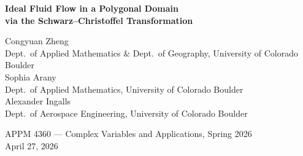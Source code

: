 \documentclass[11pt]{article}
\newcommand{\HH}{\mathbb{H}}          %
\begin{document}
\begin{titlepage}
  \centering
  \vspace*{3.5cm}
  {\LARGE\bfseries Ideal Fluid Flow in a Polygonal Domain\\[0.6em]
   via the Schwarz--Christoffel Transformation\par}
  \vspace{2.5cm}
  {\large
    Congyuan Zheng\\
    \small Dept.\ of Applied Mathematics \& Dept.\ of Geography,
    University of Colorado Boulder\\[1em]
    \large Sophia Arany\\
    \small Dept.\ of Applied Mathematics,
    University of Colorado Boulder\\[1em]
    \large Alexander Ingalls\\
    \small Dept.\ of Aerospace Engineering,
    University of Colorado Boulder\par}
  \vspace{2.5cm}
  {\normalsize APPM 4360 --- Complex Variables and Applications,
   Spring 2026\\[0.4em]
   April 27, 2026\par}
\end{titlepage}

\begin{abstract}
This paper applies the Schwarz--Christoffel (SC) conformal mapping to simulate
steady, irrotational, incompressible fluid flow inside the Boulder, Colorado
city-boundary polygon. The SC transformation maps the upper half-plane $\HH$
conformally onto the polygonal domain $\Omega$, converting analytically tractable
complex potentials in $\HH$ into physically meaningful streamline and equipotential
patterns in the physical domain. Four progressively enriched flow models are
implemented: (i)~uniform ideal flow, (ii)~terrain-corrected flow using USGS 3DEP
elevation data fitted by a thin-plate-spline radial basis function, (iii)~doubly-connected
flow with the downtown urban core modelled as an impenetrable obstacle via the
Milne-Thomson circle theorem, and (iv)~a road-vortex model placing point vortices
at major OSM road intersections. The SC parameter problem is solved via softmax
pre-vertex parameterisation and Levenberg--Marquardt least squares on side-length
ratios computed by Gauss--Legendre quadrature. All results are produced through
the forward SC map, yielding artifact-free streamlines and conformal grids that
satisfy the no-penetration boundary condition exactly by construction.
\end{abstract}
\end{document}
